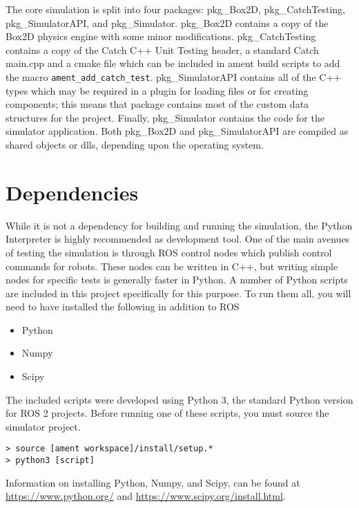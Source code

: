 The core simulation is split into four packages: pkg\_Box2D, pkg\_CatchTesting, pkg\_SimulatorAPI, and pkg\_Simulator. pkg\_Box2D contains a copy of the Box2D physics engine with some minor modifications. pkg\_CatchTesting contains a copy of the Catch C++ Unit Testing header, a standard Catch main.cpp and a cmake file which can be included in ament build scripts to add the macro \lstinline|ament_add_catch_test|. pkg\_SimulatorAPI contains all of the C++ types which may be required in a plugin for loading files or for creating components; this means that package contains most of the custom data structures for the project. Finally, pkg\_Simulator contains the code for the simulator application. Both pkg\_Box2D and pkg\_SimulatorAPI are compiled as shared objects or dlls, depending upon the operating system.

\section{Dependencies}
While it is not a dependency for building and running the simulation, the Python Interpreter is highly recommended as development tool. One of the main avenues of testing the simulation is through ROS control nodes which publish control commands for robots. These nodes can be written in C++, but writing simple nodes for specific tests is generally faster in Python. A number of Python scripts are included in this project specifically for this purpose. To run them all, you will need to have installed the following in addition to ROS
\begin{itemize}
	\item Python
	\item Numpy
	\item Scipy
\end{itemize}
The included scripts were developed using Python 3, the standard Python version for ROS 2 projects.
Before running one of these scripts, you must source the simulator project.
\begin{lstlisting}
> source [ament workspace]/install/setup.*
> python3 [script]
\end{lstlisting}

Information on installing Python, Numpy, and Scipy, can be found at \url{https://www.python.org/} and \url{https://www.scipy.org/install.html}.

